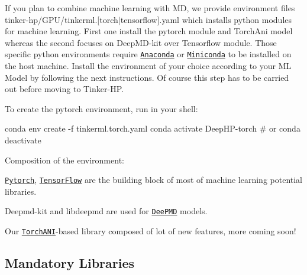 If you plan to combine machine learning with M\-D, we provide environment files {\ttfamily tinker-\/hp/\-G\-P\-U/tinkerml.\mbox{[}torch$|$tensorflow\mbox{]}.yaml} which installs python modules for machine learning. First one install the pytorch module and Torch\-Ani model whereas the second focuses on Deep\-M\-D-\/kit over Tensorflow module. Those specific python environments require \href{https://www.anaconda.com/products/distribution}{\tt Anaconda} or \href{https://docs.conda.io/en/latest/miniconda.html}{\tt Miniconda} to be installed on the host machine. Install the environment of your choice according to your M\-L Model by following the next instructions. Of course this step has to be carried out before moving to Tinker-\/\-H\-P.

To create the pytorch environment, run in your shell\-:


\begin{DoxyCode}
conda env create -f tinkerml.torch.yaml
conda activate DeepHP-torch 
\textcolor{preprocessor}{# or conda deactivate}
\end{DoxyCode}


Composition of the environment\-:
\begin{DoxyItemize}
\item \href{https://pytorch.org/}{\tt Pytorch}, \href{https://www.tensorflow.org/}{\tt Tensor\-Flow} are the building block of most of machine learning potential libraries.
\item Deepmd-\/kit and libdeepmd are used for \href{https://docs.deepmodeling.com/projects/deepmd/en/master/index.html}{\tt Dee\-P\-M\-D} models.
\item Our \href{https://aiqm.github.io/torchani/}{\tt Torch\-A\-N\-I}-\/based library composed of lot of new features, more coming soon!
\end{DoxyItemize}

\subsection*{Mandatory Libraries}


